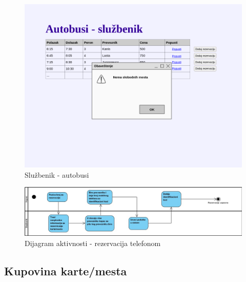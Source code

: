 \begin {figure} [h!tb]
  \centering
  \includegraphics[width=1.2\linewidth]{../Slike/Veb/autobusi_sluzbenik.png}
  \caption {Slu\v zbenik - autobusi}
  \label {fig:sluzbenikautobusi}
\end {figure}
\begin{figure} [h!tb]
  
	
	\includegraphics[width=1.1\linewidth]{../Slike/rezervacijaTelefonom}
	\caption{Dijagram aktivnosti - rezervacija telefonom}
	\label{fig:rezervacijatelefonom}
\end{figure}	

\newpage
\subsection{Kupovina karte/mesta}
